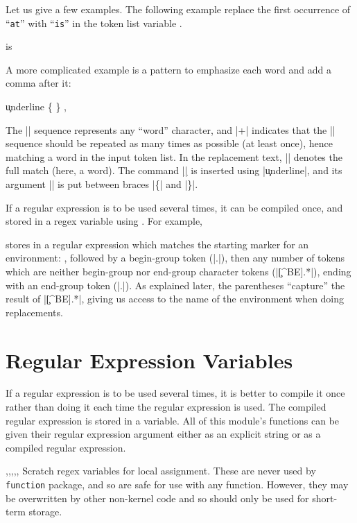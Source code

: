 \documentclass[oneside]{book}
\begin{document}
Let us give a few examples. The following example replace the first
occurrence of \enquote{\texttt{at}} with \enquote{\texttt{is}}
in the token list variable .
\begin{demohigh}
\tlSet {}
 {is} \lTmpaTl
\tlUse \lTmpaTl
\end{demohigh}
A more complicated example is
a pattern to emphasize each word and add a comma after it:
\begin{demohigh}
\tlSet {}
\regexReplaceAll {\w+} {\c{underline} \cB\{ \0 \cE\} ,} \lTmpaTl
\tlUse \lTmpaTl
\end{demohigh}
The |\w| sequence represents any \enquote{word} character, and |+|
indicates that the |\w| sequence should be repeated as many times as
possible (at least once), hence matching a word in the input token
list. In the replacement text, |\0| denotes the full match (here, a
word).  The command |\underline| is inserted using |\c{underline}|,
and its argument |\0| is put between braces |\cB\{| and |\cE\}|.

If a regular expression is to be used several times,
it can be compiled once, and stored in a regex
variable using . For example,
\begin{codehigh}
\regexNew \lFooRegex
\regexSet {}
\end{codehigh}
stores in  a regular expression which matches the
starting marker for an environment: , followed by a
begin-group token (|\cB.|), then any number of tokens which are
neither begin-group nor end-group character tokens (|\c[^BE].*|),
ending with an end-group token (|\cE.|). As explained later,
the parentheses \enquote{capture} the result of |\c[^BE].*|,
giving us access to the name of the environment when doing
replacements.

\section{Regular Expression Variables}

If a regular expression is to be used several times,
it is better to compile it once rather than doing it
each time the regular expression is used. The compiled
regular expression is stored in a variable. All
of this module's functions can be given their
regular expression argument either as an explicit string
or as a compiled regular expression.

\begin{variable}{\lTmpaRegex,\lTmpbRegex,\lTmpcRegex,\lTmpiRegex,\lTmpjRegex,\lTmpkRegex}
Scratch regex variables for local assignment. These are never used by
\verb!function! package, and so are safe for use with any function.
However, they may be overwritten by other non-kernel
code and so should only be used for short-term storage.
\end{variable}
\end{document}
